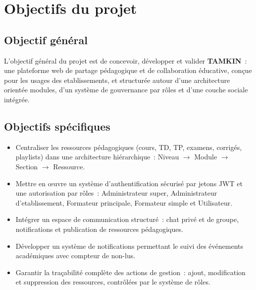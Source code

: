 \documentclass[12pt,a4paper,oneside]{report}
\begin{document}
\medskip
\noindent{}
\medskip

\section{Objectifs du projet}
\label{sec:objectifs}

\subsection{Objectif g\'en\'eral}

L'objectif g\'en\'eral du projet est de concevoir, d\'evelopper et valider \textbf{TAMKIN}~: une plateforme web de partage p\'edagogique et de collaboration éducative, con\c{c}ue pour les usages des etablissements, et structur\'ee autour d'une architecture orient\'ee modules, d'un syst\`eme de gouvernance par r\^oles et d'une couche sociale int\'egr\'ee.

\subsection{Objectifs sp\'ecifiques}

\begin{itemize}
  \item[\textbf{OS1.}] Centraliser les ressources p\'edagogiques (cours, TD, TP, examens, corrig\'es, playlists) dans une architecture hi\'erarchique~: Niveau $\rightarrow$ Module $\rightarrow$ Section $\rightarrow$ Ressource.
  \item[\textbf{OS2.}] Mettre en \oe uvre un syst\`eme d'authentification s\'ecuris\'e par jetons JWT et une autorisation par r\^oles~: Administrateur super, Administrateur d'etablissement, Formateur principale, Formateur simple et Utilisateur.
  \item[\textbf{OS3.}] Int\'egrer un espace de communication structur\'e~: chat priv\'e et de groupe, notifications et publication de ressources p\'edagogiques.
  \item[\textbf{OS4.}] D\'evelopper un syst\`eme de notifications permettant le suivi des \'ev\'enements acad\'emiques avec compteur de non-lus.
  \item[\textbf{OS5.}] Garantir la tra\c{c}abilit\'e compl\`ete des actions de gestion~: ajout, modification et suppression des ressources, contr\^ol\'ees par le syst\`eme de r\^oles.
\end{itemize}
\end{document}
